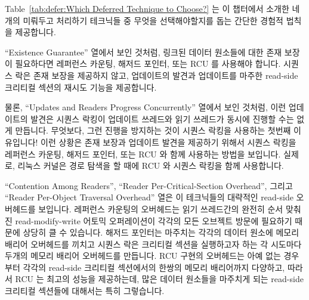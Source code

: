 Table~\ref{tab:defer:Which Deferred Technique to Choose?}
는 이 챕터에서 소개한 네개의 미뤄두고 처리하기 테크닉들 중 무엇을
선택해야할지를 돕는 간단한 경험적 법칙을 제공합니다.

``Existence Guarantee'' 열에서 보인 것처럼, 링크된 데이터 원소들에 대한 존재
보장이 필요하다면 레퍼런스 카운팅, 해저드 포인터, 또는 RCU 를 사용해야 합니다.
시퀀스 락은 존재 보장을 제공하지 않고, 업데이트의 발견과 업데이트를 마주한
read-side 크리티컬 섹션의 재시도 기능을 제공합니다.
\iffalse

Table~\ref{tab:defer:Which Deferred Technique to Choose?}
provides some rough rules of thumb that can help you choose among the
four deferred-processing techniques presented in this chapter.

As shown in the ``Existence Guarantee'' row,
if you need existence guarantees for linked
data elements, you must use reference counting, hazard pointers, or RCU.
Sequence locks do not provide existence guarantees, instead providing
detection of updates, retrying any read-side critical sections
that do encounter an update.
\fi

물론, ``Updates and Readers Progress Concurrently'' 열에서 보인 것처럼, 이런
업데이트의 발견은 시퀀스 락킹이 업데이트 쓰레드와 읽기 쓰레드가 동시에 진행할
수는 없게 만듭니다.
무엇보다, 그런 진행을 방지하는 것이 시퀀스 락킹을 사용하는 첫번째 이유입니다!
이런 상황은 존재 보장과 업데이트 발견을 제공하기 위해서 시퀀스 락킹을 레퍼런스
카운팅, 해저드 포인터, 또는 RCU 와 함께 사용하는 방법을 보입니다.
실제로, 리눅스 커널은 경로 탐색을 할 때에 RCU 와 시퀀스 락킹을 함께 사용합니다.
\iffalse

Of course, as shown in the ``Updates and Readers Progress Concurrently''
row, this detection of updates implies
that sequence locking does not permit updaters and readers to make forward
progress concurrently.
After all, preventing such forward progress is the whole point of using
sequence locking in the first place!
This situation points the way to using sequence locking in conjunction
with reference counting, hazard pointers, or RCU in order to provide
both existence guarantees and update detection.
In fact, the Linux kernel combines RCU and sequence locking in
this manner during pathname lookup.
\fi

``Contention Among Readers'', ``Reader Per-Critical-Section Overhead'',
그리고 ``Reader Per-Object Traversal Overhead'' 열은 이 테크닉들의 대략적인
read-side 오버헤드를 보입니다.
레퍼런스 카운팅의 오버헤드는 읽기 쓰레드간의 완전히 순서 맞춰진
read-modify-write 어토믹 오퍼레이션이 각각의 모든 오브젝트 방문에 필요하기
때문에 상당히 클 수 있습니다.
해저드 포인터는 마주치는 각각의 데이터 원소에 메모리 배리어 오버헤드를 끼치고
시퀀스 락은 크리티컬 섹션을 실행하고자 하는 각 시도마다 두개의 메모리 배리어
오버헤드를 만듭니다.
RCU 구현의 오버헤드는 아예 없는 경우부터 각각의 read-side 크리티컬 섹션에서의
한쌍의 메모리 배리어까지 다양하고, 따라서 RCU 는 최고의 성능을 제공하는데, 많은
데이터 원소들을 마주치게 되는 read-side 크리티컬 섹션들에 대해서는 특히
그렇습니다.
\iffalse

